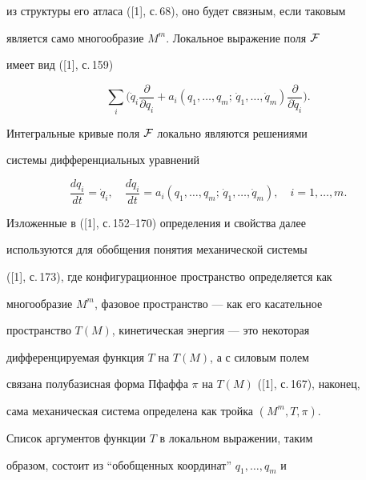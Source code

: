 из структуры его атласа ([1], с.\,68), оно будет связным, если таковым 


является само многообразие $M^m$. Локальное выражение поля $\cal F$ 


имеет вид ([1], с.\,159) 


\begin{equation} 


\sum_i\bigg(\Dot q_i\frac{\partial}{\partial q_i}+a_i


(q_1,\dotsc,q_m;\,\Dot q_1,\dotsc,\Dot q_m) 


\frac{\partial}{\partial\Dot q_i}\bigg). 


\end{equation} 


 


Интегральные кривые поля $\cal F$ локально являются решениями 


системы дифференциальных уравнений 


\begin{equation} 


\frac{dq_i}{dt}=\Dot q_i,\quad 


\frac{d\Dot q_i}{dt}=a_i(q_1,\dotsc,q_m;\, 


\Dot q_1,\dotsc,\Dot q_m),\quad i=1,\dotsc,m. 


\end{equation} 


 


Изложенные в ([1], с.\,152--170) определения и свойства далее 


используются для обобщения понятия механической системы


([1], с.\,173), где конфигурационное пространство определяется как 


многообразие $M^m$, фазовое пространство --- как его касательное 


пространство $T(M)$, кинетическая энергия --- это некоторая 


дифференцируемая функция $T$ на $T(M)$, а с силовым полем 


связана полубазисная форма Пфаффа $\pi$ на $T(M)$ ([1], с.\,167), наконец, 


сама механическая система определена как тройка $(M^m,T,\pi)$. 


 


Список аргументов функции $T$ в локальном выражении, таким 


образом, состоит из ``обобщенных координат'' $q_1,\dotsc,q_m$ и 


